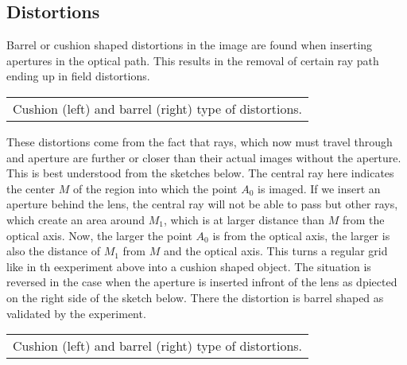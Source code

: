 \documentclass[letterpaper,10pt,english]{sphinxmanual}
\begin{document}
\subsection{Distortions}
\label{\detokenize{notebooks/L7/Imaging Errors:Distortions}}
Barrel or cushion shaped distortions in the image are found when inserting apertures in the optical path. This results in the removal of certain ray path ending up in field distortions.


\begin{savenotes}\sphinxattablestart
\centering
\begin{tabulary}{\linewidth}[t]{|T|}
\hline
\sphinxstyletheadfamily 
{} 
\\
\hline
{} Cushion (left) and barrel (right) type of distortions.
\\
\hline
\end{tabulary}
\par
\sphinxattableend\end{savenotes}

These distortions come from the fact that rays, which now must travel through and aperture are further or closer than their actual images without the aperture. This is best understood from the sketches below. The central ray here indicates the center \(M\) of the region into which the point \(A_0\) is imaged. If we insert an aperture behind the lens, the central ray will not be able to pass but other rays, which create an area around \(M_1\), which is at larger distance than
\(M\) from the optical axis. Now, the larger the point \(A_0\) is from the optical axis, the larger is also the distance of \(M_1\) from \(M\) and the optical axis. This turns a regular grid like in th eexperiment above into a cushion shaped object. The situation is reversed in the case when the aperture is inserted infront of the lens as dpiected on the right side of the sketch below. There the distortion is barrel shaped as validated by the experiment.


\begin{savenotes}\sphinxattablestart
\centering
\begin{tabulary}{\linewidth}[t]{|T|}
\hline
\sphinxstyletheadfamily 
{}
\\
\hline
{} Cushion (left) and barrel (right) type of distortions.
\\
\hline
\end{tabulary}
\par
\sphinxattableend\end{savenotes}
\end{document}
